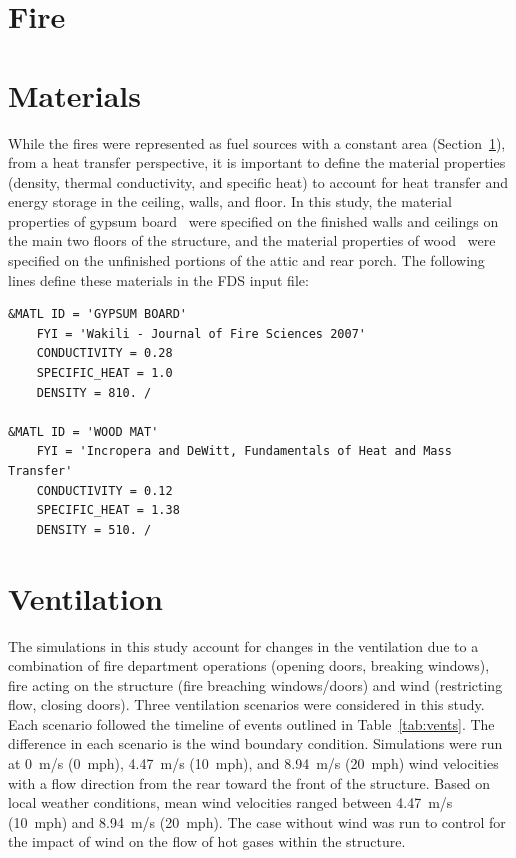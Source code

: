 \documentclass[12pt,oneside]{book}
\begin{document}
\section{Fire}
\label{fire}

\section{Materials}
\label{matl}
While the fires were represented as fuel sources with a constant area (Section~\ref{fire}), from a heat transfer perspective, it is important to define the material properties (density, thermal conductivity, and specific heat) to account for heat transfer and energy storage in the ceiling, walls, and floor. In this study, the material properties of gypsum board~\cite{WAKILI2007} were specified on the finished walls and ceilings on the main two floors of the structure, and the material properties of wood~\cite{Incropera:1} were specified on the unfinished portions of the attic and rear porch. The following lines define these materials in the FDS input file:

\begin{lstlisting}
&MATL ID = 'GYPSUM BOARD'
    FYI = 'Wakili - Journal of Fire Sciences 2007' 
    CONDUCTIVITY = 0.28
    SPECIFIC_HEAT = 1.0
    DENSITY = 810. /

&MATL ID = 'WOOD MAT'
    FYI = 'Incropera and DeWitt, Fundamentals of Heat and Mass Transfer'
    CONDUCTIVITY = 0.12
    SPECIFIC_HEAT = 1.38
    DENSITY = 510. / 
\end{lstlisting}

\section{Ventilation}
\label{Vents}
The simulations in this study account for changes in the ventilation due to a combination of fire department operations (opening doors, breaking windows), fire acting on the structure (fire breaching windows/doors) and wind (restricting flow, closing doors). Three ventilation scenarios were considered in this study. Each scenario followed the timeline of events outlined in Table~\ref{tab:vents}. The difference in each scenario is the wind boundary condition. Simulations were run at 0~m/s (0~mph), 4.47~m/s (10~mph), and 8.94~m/s (20~mph) wind velocities with a flow direction from the rear toward the front of the structure. Based on local weather conditions, mean wind velocities ranged between 4.47~m/s (10~mph) and 8.94~m/s (20~mph). The case without wind was run to control for the impact of wind on the flow of hot gases within the structure.
\end{document}
